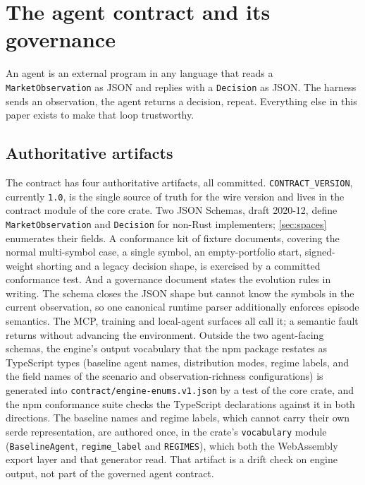 \section{The agent contract and its governance}\label{sec:contract}

An agent is an external program in any language that reads a \texttt{MarketObservation} as JSON and replies with a \texttt{Decision} as JSON. The harness sends an observation, the agent returns a decision, repeat. Everything else in this paper exists to make that loop trustworthy.

\subsection{Authoritative artifacts}\label{sec:contract-artifacts}

The contract has four authoritative artifacts, all committed. \texttt{CONTRACT\_VERSION}, currently \texttt{1.0}, is the single source of truth for the wire version and lives in the contract module of the core crate. Two JSON Schemas, draft 2020-12, define \texttt{MarketObservation} and \texttt{Decision} for non-Rust implementers; \cref{sec:spaces} enumerates their fields. A conformance kit of fixture documents, covering the normal multi-symbol case, a single symbol, an empty-portfolio start, signed-weight shorting and a legacy decision shape, is exercised by a committed conformance test. And a governance document states the evolution rules in writing. The schema closes the JSON shape but cannot know the symbols in the current observation, so one canonical runtime parser additionally enforces episode semantics. The MCP, training and local-agent surfaces all call it; a semantic fault returns without advancing the environment. Outside the two agent-facing schemas, the engine's output vocabulary that the npm package restates as TypeScript types (baseline agent names, distribution modes, regime labels, and the field names of the scenario and observation-richness configurations) is generated into \texttt{contract/engine-enums.v1.json} by a test of the core crate, and the npm conformance suite checks the TypeScript declarations against it in both directions. The baseline names and regime labels, which cannot carry their own serde representation, are authored once, in the crate's \texttt{vocabulary} module (\texttt{BaselineAgent}, \texttt{regime\_label} and \texttt{REGIMES}), which both the WebAssembly export layer and that generator read. That artifact is a drift check on engine output, not part of the governed agent contract.

